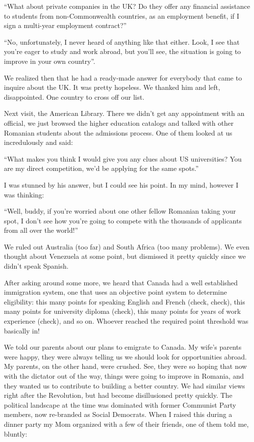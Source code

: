 \documentclass[12pt]{book}
\begin{document}
``What about private companies in the UK? Do they offer any financial
assistance to students from non-Commonwealth countries, as an employment
benefit, if I sign a multi-year employment contract?''

``No, unfortunately, I never heard of anything like that either. Look, I
see that you're eager to study and work abroad, but you'll see, the
situation is going to improve in your own country''.

We realized then that he had a ready-made answer for everybody that came
to inquire about the UK. It was pretty hopeless. We thanked him and
left, disappointed. One country to cross off our list.

Next visit, the American Library. There we didn't get any appointment
with an official, we just browsed the higher education catalogs and
talked with other Romanian students about the admissions process. One of
them looked at us incredulously and said:

``What makes you think I would give you any clues about US universities?
You are my direct competition, we'd be applying for the same spots.''

I was stunned by his answer, but I could see his point. In my mind,
however I was thinking:

``Well, buddy, if you're worried about one other fellow Romanian taking
your spot, I don't see how you're going to compete with the thousands of
applicants from all over the world!''

We ruled out Australia (too far) and South Africa (too many problems).
We even thought about Venezuela at some point, but dismissed it pretty
quickly since we didn't speak Spanish.

After asking around some more, we heard that Canada had a well
established immigration system, one that uses an objective point system
to determine eligibility: this many points for speaking English and
French (check, check), this many points for university diploma (check),
this many points for years of work experience (check), and so on.
Whoever reached the required point threshold was basically in!

We told our parents about our plans to emigrate to Canada. My wife's
parents were happy, they were always telling us we should look for
opportunities abroad. My parents, on the other hand, were crushed. See,
they were so hoping that now with the dictator out of the way, things
were going to improve in Romania, and they wanted us to contribute to
building a better country. We had similar views right after the
Revolution, but had become disillusioned pretty quickly. The political
landscape at the time was dominated with former Communist Party members,
now re-branded as Social Democrats. When I raised this during a dinner
party my Mom organized with a few of their friends, one of them told me,
bluntly:
\end{document}
